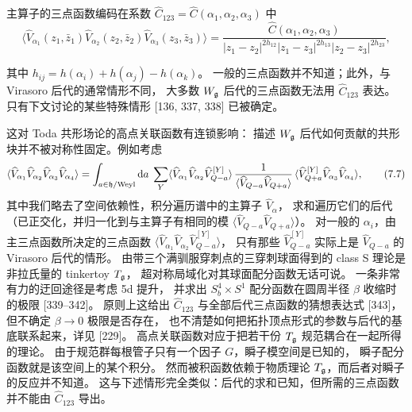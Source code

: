 主算子的三点函数编码在系数 $\widehat{C}_{123}=\widehat{C}(\alpha_1,\alpha_2,\alpha_3)$ 中
\begin{equation}
\langle\widehat{V}_{\alpha_1}(z_1,\bar z_1)\widehat{V}_{\alpha_2}(z_2,\bar z_2)
\widehat{V}_{\alpha_3}(z_3,\bar z_3)\rangle
=\frac{\widehat{C}(\alpha_1,\alpha_2,\alpha_3)}
{|z_1-z_2|^{2h_{12}}|z_1-z_3|^{2h_{13}}|z_2-z_3|^{2h_{23}}},
\tag{7.6}
\end{equation}

其中 $h_{ij}=h(\alpha_i)+h(\alpha_j)-h(\alpha_k)$。
一般的三点函数并不知道；此外，与 Virasoro 后代的通常情形不同，
大多数 $W_{\mathfrak{g}}$ 后代的三点函数无法用 $\widehat{C}_{123}$ 表达。
只有下文讨论的某些特殊情形 [136, 337, 338] 已被确定。

这对 Toda 共形场论的高点关联函数有连锁影响：
描述 $W_{\mathfrak{g}}$ 后代如何贡献的共形块并不被对称性固定。例如考虑
\begin{equation}
\langle\widehat{V}_{\alpha_1}\widehat{V}_{\alpha_2}\widehat{V}_{\alpha_3}
\widehat{V}_{\alpha_4}\rangle
=\int_{a\in\mathfrak{h}/\mathrm{Weyl}}\mathrm{d} a\;\sum_{Y}
\langle\widehat{V}_{\alpha_1}\widehat{V}_{\alpha_2}\widehat{V}^{[Y]}_{Q-a}\rangle\,
\frac{1}{\langle\widehat{V}_{Q-a}\widehat{V}_{Q+a}\rangle}\,
\langle\widehat{V}^{[Y]}_{Q+a}\widehat{V}_{\alpha_3}\widehat{V}_{\alpha_4}\rangle,
\tag{7.7}
\end{equation}
其中我们略去了空间依赖性，积分遍历谱中的主算子 $\widehat{V}_\alpha$，
求和遍历它们的后代（已正交化，并归一化到与主算子有相同的模 $\langle\widehat{V}_{Q-a}\widehat{V}_{Q+a}\rangle$）。
对一般的 $\alpha_i$，由主三点函数所决定的三点函数 $\langle\widehat{V}_{\alpha_1}\widehat{V}_{\alpha_2}\widehat{V}^{[Y]}_{Q-a}\rangle$，
只有那些 $\widehat{V}^{[Y]}_{Q-a}$ 实际上是 $\widehat{V}_{Q-a}$ 的 Virasoro 后代的情形。
由带三个满驯服穿刺点的三穿刺球面得到的 class S 理论是非拉氏量的 tinkertoy $T_{\mathfrak{g}}$，
超对称局域化对其球面配分函数无话可说。
一条非常有力的迂回途径是考虑 5d 提升，
并求出 $S^4_b\times S^1$ 配分函数在圆周半径 $\beta$ 收缩时的极限 [339--342]。
原则上这给出 $\widehat{C}_{123}$ 与全部后代三点函数的猜想表达式 [343]，
但不确定 $\beta\to 0$ 极限是否存在，
也不清楚如何把拓扑顶点形式的参数与后代的基底联系起来，详见 [229]。
高点关联函数对应于把若干份 $T_{\mathfrak{g}}$ 规范耦合在一起所得的理论。
由于规范群每根管子只有一个因子 $G$，瞬子模空间是已知的，
瞬子配分函数就是该空间上的某个积分。
然而被积函数依赖于物质理论 $T_{\mathfrak{g}}$，而后者对瞬子的反应并不知道。
这与下述情形完全类似：后代的求和已知，但所需的三点函数并不能由 $\widehat{C}_{123}$ 导出。


